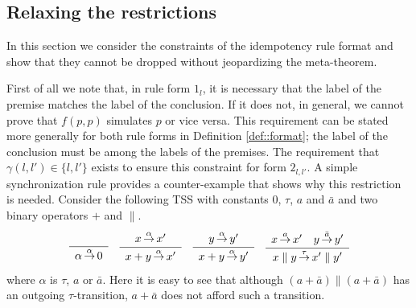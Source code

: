 \subsection{Relaxing the restrictions} %

In this section we consider the constraints of the idempotency rule format and show that they cannot be dropped without jeopardizing the meta-theorem.


First of all we note that, in rule form $1_l$, it is necessary that the label of the premise matches
the label of the conclusion.
If it does not, in general, we cannot prove that $f(p,p)$ simulates $p$ or vice versa.
This requirement can be stated more generally for both rule forms in Definition \ref{def::format};
the label of the conclusion must be among the labels of the premises.
The requirement that $\gamma(l,l') \in \{l,l'\}$ exists to ensure this constraint for form $2_{l,l'}$.
A simple synchronization rule provides a counter-example that shows why this restriction is needed.
Consider the following TSS with constants $0$, $\tau$, $a$ and $\bar{a}$ and two binary operators $+$ and $\parallel$.
\[
\begin{array}{c}
    \sosrule{}{\alpha \trans{\alpha} 0} \quad
    \sosrule{x \trans{\alpha} x'}{x + y \trans{\alpha} x' } \quad \sosrule{y \trans{\alpha} y'}{x + y \trans{\alpha} y' }
    \quad \sosrule{x \trans{a} x' \quad  y \trans{\bar{a}} y'}{x \parallel y \trans{\tau} x' \parallel y'}
\end{array}
\]
where $\alpha$ is $\tau$, $a$ or $\bar{a}$.
Here it is easy to see that although
$(a + \bar{a}) \parallel (a + \bar{a})$ has an outgoing \mbox{$\tau$-transition}, $a + \bar{a}$ does not afford such a transition.

